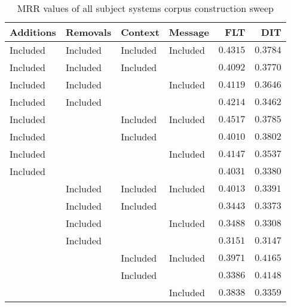 
\begin{table}
\begin{spacing}{1.2}
\centering
\caption{MRR values of all subject systems corpus construction sweep}
\label{table:all_corpus_sweep}
\vspace{0.2em}
\begin{tabular}{llll|rr}
\toprule
Additions &  Removals &   Context &   Message &           FLT &           DIT \\
\midrule
 Included &  Included &  Included &  Included &      $0.4315$ &      $0.3784$ \\
 \myrowcolor Included &  Included &  Included &           &      $0.4092$ &      $0.3770$ \\
 Included &  Included &           &  Included &      $0.4119$ &      $0.3646$ \\
 Included &  Included &           &           &      $0.4214$ &      $0.3462$ \\
 Included &           &  Included &  Included & $\bm{0.4517}$ &      $0.3785$ \\
 Included &           &  Included &           &      $0.4010$ &      $0.3802$ \\
 Included &           &           &  Included &      $0.4147$ &      $0.3537$ \\
 Included &           &           &           &      $0.4031$ &      $0.3380$ \\
          &  Included &  Included &  Included &      $0.4013$ &      $0.3391$ \\
          &  Included &  Included &           &      $0.3443$ &      $0.3373$ \\
          &  Included &           &  Included &      $0.3488$ &      $0.3308$ \\
          &  Included &           &           &      $0.3151$ &      $0.3147$ \\
          &           &  Included &  Included &      $0.3971$ & $\bm{0.4165}$ \\
          &           &  Included &           &      $0.3386$ &      $0.4148$ \\
          &           &           &  Included &      $0.3838$ &      $0.3359$ \\
\bottomrule
\end{tabular}

\end{spacing}
\end{table}
